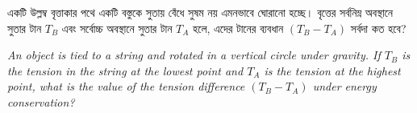 \documentclass[12pt, a4paper]{article}
\begin{document}
\begin{tcolorbox}[questionbox={প্রশ্ন (Question) 30}]
\noindent
একটি উল্লম্ব বৃত্তাকার পথে একটি বস্তুকে সুতায় বেঁধে সুষম নয় এমনভাবে ঘোরানো হচ্ছে। বৃত্তের সর্বনিম্ন অবস্থানে সুতার টান $T_B$ এবং সর্বোচ্চ অবস্থানে সুতার টান $T_A$ হলে, এদের টানের ব্যবধান $(T_B - T_A)$ সর্বদা কত হবে?

\vspace{0.8em}
\begin{english}
\noindent\textit{\color{darkgray}
An object is tied to a string and rotated in a vertical circle under gravity. If $T_B$ is the tension in the string at the lowest point and $T_A$ is the tension at the highest point, what is the value of the tension difference $(T_B - T_A)$ under energy conservation?
}
\end{english}
\end{tcolorbox}
\end{document}

